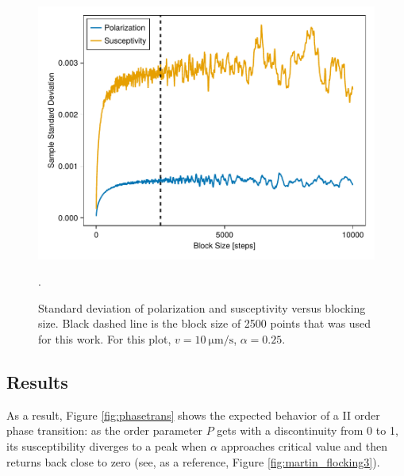 \documentclass[../../master_thesis_np.tex]{subfiles}
\begin{document}
		\begin{figure}[htp]
			\centering
			\includegraphics[width= \singfigwidth]{phasetrans/blocksize_v10.pdf}
			\caption{Standard deviation of polarization and susceptivity versus blocking size. Black dashed line is the block size of 2500 points that was used for this work. For this plot, $v = \SI{10}{\um\per\second}$, $\alpha = 0.25$.}.
			\label{fig:blocksize}
		\end{figure}

		
		\subsection{Results}
		As a result, Figure \ref{fig:phasetrans} shows the expected behavior of a II order phase transition: as the order parameter $P$ gets with a discontinuity from 0 to 1, its susceptibility diverges to a peak when $\alpha$ approaches critical value and then returns back close to zero (see, as a reference, Figure \ref{fig:martin_flocking3}).
		
\end{document}
